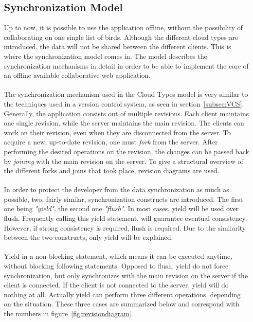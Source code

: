 \documentclass[a4paper,12pt]{report}
\begin{document}
\subsection{Synchronization Model}\label{subsec:SynchronizationModel}

Up to now, it is possible to use the application offline, without the possibility of collaborating on one single list of birds. Although the different cloud types are introduced, the data will not be shared between the different clients. This is where the synchronization model comes in. The model describes the synchronization mechanisms in detail in order to be able to implement the core of an offline available collaborative web application.\\
\\
The synchronization mechanism used in the Cloud Types model is very similar to the techniques used in a version control system, as seen in section~\ref{subsec:VCS}. Generally, the application consists out of multiple revisions. Each client maintains one single revision, while the server maintains the main revision. The clients can work on their revision, even when they are disconnected from the server. To acquire a new, up-to-date revision, one must \textit{fork} from the server. After performing the desired operations on the revision, the changes can be passed back by \textit{joining} with the main revision on the server. To give a structural overview of the different forks and joins that took place, revision diagrams are used.\\
\\
In order to protect the developer from the data synchronization as much as possible, two, fairly similar, synchronization constructs are introduced. The first one being \textit{"yield"}, the second one \textit{"flush"}. In most cases, yield will be used over flush. Frequently calling this yield statement, will guarantee eventual consistency. However, if strong consistency is required, flush is required. Due to the similarity between the two constructs, only yield will be explained.\\
\\
Yield in a non-blocking statement, which means it can be executed anytime, without blocking following statements. Opposed to flush, yield do not force synchronization, but only synchronizes with the main revision on the server if the client is connected. If the client is not connected to the server, yield will do nothing at all. Actually yield can perform three different operations, depending on the situation. These three cases are summarized below and correspond with the numbers in figure~\ref{fig:revisiondiagram}. 
\end{document}
